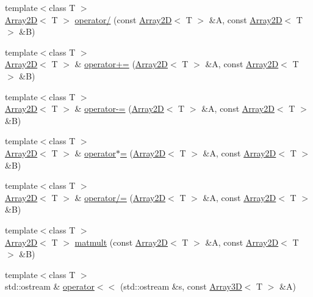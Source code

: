 \begin{DoxyCompactItemize}
\item 
{\footnotesize template$<$class T $>$ }\\\hyperlink{classTNT_1_1Array2D}{Array2\-D}$<$ T $>$ \hyperlink{namespaceTNT_af2275486defb3aa682168d59c8b5fefa}{operator/} (const \hyperlink{classTNT_1_1Array2D}{Array2\-D}$<$ T $>$ \&A, const \hyperlink{classTNT_1_1Array2D}{Array2\-D}$<$ T $>$ \&B)
\item 
{\footnotesize template$<$class T $>$ }\\\hyperlink{classTNT_1_1Array2D}{Array2\-D}$<$ T $>$ \& \hyperlink{namespaceTNT_a613b54428f9d71ec88bba64f0b1b2956}{operator+=} (\hyperlink{classTNT_1_1Array2D}{Array2\-D}$<$ T $>$ \&A, const \hyperlink{classTNT_1_1Array2D}{Array2\-D}$<$ T $>$ \&B)
\item 
{\footnotesize template$<$class T $>$ }\\\hyperlink{classTNT_1_1Array2D}{Array2\-D}$<$ T $>$ \& \hyperlink{namespaceTNT_a5f46b48fb7c2c25d9c78c888dfbfbb59}{operator-\/=} (\hyperlink{classTNT_1_1Array2D}{Array2\-D}$<$ T $>$ \&A, const \hyperlink{classTNT_1_1Array2D}{Array2\-D}$<$ T $>$ \&B)
\item 
{\footnotesize template$<$class T $>$ }\\\hyperlink{classTNT_1_1Array2D}{Array2\-D}$<$ T $>$ \& \hyperlink{namespaceTNT_a5d9f342f2de5edc0fce4481982924e44}{operator$\ast$=} (\hyperlink{classTNT_1_1Array2D}{Array2\-D}$<$ T $>$ \&A, const \hyperlink{classTNT_1_1Array2D}{Array2\-D}$<$ T $>$ \&B)
\item 
{\footnotesize template$<$class T $>$ }\\\hyperlink{classTNT_1_1Array2D}{Array2\-D}$<$ T $>$ \& \hyperlink{namespaceTNT_a3a7f9891f9ba3972d65fe38e18e94a1a}{operator/=} (\hyperlink{classTNT_1_1Array2D}{Array2\-D}$<$ T $>$ \&A, const \hyperlink{classTNT_1_1Array2D}{Array2\-D}$<$ T $>$ \&B)
\item 
{\footnotesize template$<$class T $>$ }\\\hyperlink{classTNT_1_1Array2D}{Array2\-D}$<$ T $>$ \hyperlink{namespaceTNT_a4c23204963622fcd58b1f5e0753a9a96}{matmult} (const \hyperlink{classTNT_1_1Array2D}{Array2\-D}$<$ T $>$ \&A, const \hyperlink{classTNT_1_1Array2D}{Array2\-D}$<$ T $>$ \&B)
\item 
{\footnotesize template$<$class T $>$ }\\std\-::ostream \& \hyperlink{namespaceTNT_aeeeff56627c80d662927afc43a148d90}{operator$<$$<$} (std\-::ostream \&s, const \hyperlink{classTNT_1_1Array3D}{Array3\-D}$<$ T $>$ \&A)
\item 

\end{DoxyCompactItemize}
